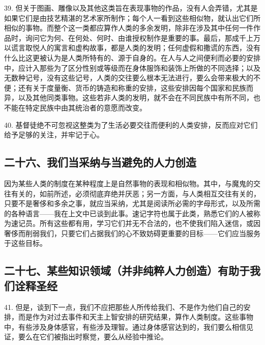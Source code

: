 39. 但关于图画、雕像以及其他这类旨在表现事物的作品，没有人会弄错，尤其是如果它们是由技艺精湛的艺术家所制作；每个人一看到这些相似物，就认出它们所相似的事物。而整个这一类都应算作人类的多余发明，除非在涉及其中任何一件作品时，询问它为何、在何处、何时、由谁授权制作是重要的事。最后，那成千上万以谎言取悦人的寓言和虚构故事，都是人类的发明；任何虚假和撒谎的东西，没有什么比这更被认为是人类所特有的、源于自身的。在人与人之间便利而必要的安排中，应计入那些为了区分性别或等级而在身体服饰和装饰上所做的不同选择；以及无数种记号，没有这些记号，人类的交往要么根本无法进行，要么会带来极大的不便；还有关于度量衡、货币的铸造和称重的安排，这些安排因每个国家和民族而异，以及其他同类事物。这些若非人类的发明，就不会在不同民族中有所不同，也不能在特定民族中由其统治者的意愿而改变。\par

40. 基督徒绝不可忽视这整类为了生活必要交往而便利的人类安排，反而应对它们给予足够的关注，并牢记于心。\par


\subsection{二十六、我们当采纳与当避免的人力创造}

因为某些人类的制度在某种程度上是自然事物的表现和相似物。其中，与魔鬼的交往有关的，如前所述，必须彻底弃绝并厌恶；另一方面，与人类相互交往有关的，只要不是奢侈和多余之事，就应当采纳，尤其是阅读所必需的字母形式，以及所需的各种语言——我在上文中已谈到此事。速记字符也属于此类，熟悉它们的人被称为速记员。所有这些都有用，学习它们并无不合法的，也不使我们陷入迷信，或因奢侈而削弱我们，只要它们占据我们的心不致妨碍更重要的目标——它们应当服务于这些目标。\par


\subsection{二十七、某些知识领域（并非纯粹人力创造）有助于我们诠释圣经}

41. 但是，谈到下一点，我们不应把那些人所传给我们、不是作为他们自己的安排，而是作为对过去事件和天主上智安排的研究结果，算作人类制度。这些事物中，有些涉及身体感官，有些涉及理智。通过身体感官达到的，我们要么相信见证，要么在它们被指出时察觉，要么从经验中推论。\par

